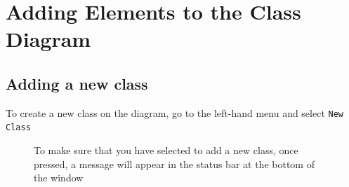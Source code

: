 \documentclass[a4paper]{article}
\begin{document}
{\newpage

\section{Adding Elements to the Class Diagram}
\subsection{Adding a new class}
To create a new class on the diagram, go to the left-hand menu and select \texttt{New Class}
\begin{figure}[H]
\begin{center}
\end{center}

To make sure that you have selected to add a new class, once pressed, a message will appear in the status bar at the bottom of the window
\begin{center}
\end{center}


\end{figure}}
\end{document}
